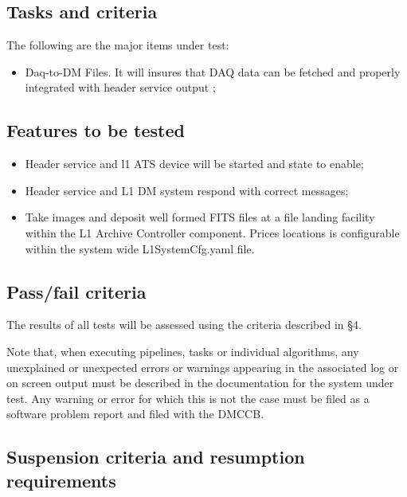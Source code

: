 \documentclass[DM,lsstdraft,STS,toc]{lsstdoc}
\begin{document}
\subsection{Tasks and criteria}
\label{sec:tasks}

The following are the major items under test:

\begin{itemize}

  \item{Daq-to-DM Files.  It will insures that DAQ data can be fetched and properly integrated with header service output ;}

 

\end{itemize}

\subsection{Features to be tested}
\label{sec:feat2test}

\begin{itemize}

  \item{Header service and l1 ATS device will be started and state to enable;}
  \item{Header service and L1 DM system respond with correct messages;}
  \item{Take images and deposit well formed FITS files at a file landing facility within the L1 Archive Controller component.   Prices locations is configurable within the system wide L1SystemCfg.yaml file.}

\end{itemize}


\subsection{Pass/fail criteria}
\label{sec:passfail}

The results of all tests will be assessed using the criteria described in
 \S4.

Note that, when executing pipelines, tasks or individual algorithms, any
unexplained or unexpected errors or warnings appearing in the associated log
or on screen output must be described in the documentation for the system
under test. Any warning or error for which this is not the case must be filed
as a software problem report and filed with the DMCCB.

\subsection{Suspension criteria and resumption requirements}
\label{suspension}
\end{document}
